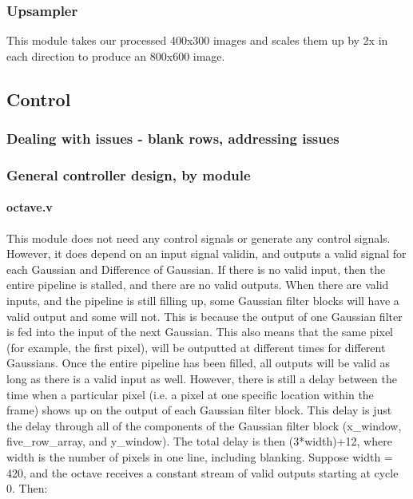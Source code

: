\documentclass[12pt]{article}
\begin{document}
\subsubsection{Upsampler}
This module takes our processed 400x300 images and scales them up by 2x in each
direction to produce an 800x600 image. 



\subsection{Control}

\subsubsection{Dealing with issues - blank rows, addressing issues}

\subsubsection{General controller design, by module}

\paragraph{octave.v}
This module does not need any control signals or generate any control signals. 
However, it does depend on an input signal validin, and outputs a valid signal 
for each Gaussian and Difference of Gaussian. If there is no valid input, then 
the entire pipeline is stalled, and there are no valid outputs. When there are 
valid inputs, and the pipeline is still filling up, some Gaussian filter blocks 
will have a valid output and some will not. This is because the output of one 
Gaussian filter is fed into the input of the next Gaussian. This also means that 
the same pixel (for example, the first pixel), will be outputted at different 
times for different Gaussians. Once the entire pipeline has been filled, all 
outputs will be valid as long as there is a valid input as well. However, there 
is still a delay between the time when a particular pixel (i.e. a pixel at one 
specific location within the frame) shows up on the output of each Gaussian 
filter block. This delay is just the delay through all of the components of the 
Gaussian filter block (x\_window, five\_row\_array, and y\_window). The total delay 
is then (3*width)+12, where width is the number of pixels in one line, including 
blanking. Suppose width = 420, and the octave receives a constant stream of 
valid outputs starting at cycle 0. Then:
\end{document}
